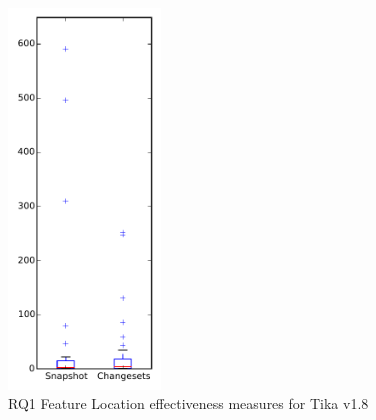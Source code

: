 
\begin{figure}[t]
\centering
\includegraphics[width=0.36\textwidth]{figures/flt/rq1_tika}
\caption{RQ1 Feature Location effectiveness measures for Tika v1.8}
\label{fig:flt:rq1:tika}
\end{figure}
